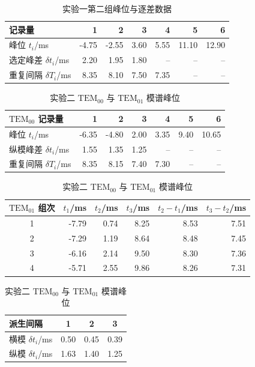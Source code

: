 \documentclass[UTF8,a4paper,10pt]{ctexart}
\begin{document}
\begin{table}[H]
  \centering
  \caption{实验一第二组峰位与逐差数据}
  \begin{tabular}{lrrrrrr}
    \toprule
    记录量 & 1 & 2 & 3 & 4 & 5 & 6 \\
    \midrule
    峰位 $t_i$/ms & -4.75 & -2.55 & 3.60 & 5.55 & 11.10 & 12.90 \\
    选定峰差 $\delta t_i$/ms & 2.20 & 1.95 & 1.80 & -- & -- & -- \\
    重复间隔 $\delta T_i$/ms & 8.35 & 8.10 & 7.50 & 7.35 & -- & -- \\
    \bottomrule
  \end{tabular}
\end{table}

\begin{table}[H]
  \centering
  \caption{实验二 $\mathrm{TEM}_{00}$ 与 $\mathrm{TEM}_{01}$ 模谱峰位}
  \begin{tabular}{lrrrrrr}
    \toprule
    $\mathrm{TEM}_{00}$ 记录量 & 1 & 2 & 3 & 4 & 5 & 6 \\
    \midrule
    峰位 $t_i$/ms & -6.35 & -4.80 & 2.00 & 3.35 & 9.40 & 10.65 \\
    纵模峰差 $\delta t_i$/ms & 1.55 & 1.35 & 1.25 & -- & -- & -- \\
    重复间隔 $\delta T_i$/ms & 8.35 & 8.15 & 7.40 & 7.30 & -- & -- \\
    \bottomrule
  \end{tabular}
  \par\medskip
  \setlength{\tabcolsep}{8pt}
  \begin{tabular}{crrrrr}
    \toprule
    $\mathrm{TEM}_{01}$ 组次 & $t_1$/ms & $t_2$/ms & $t_3$/ms & $t_2-t_1$/ms & $t_3-t_2$/ms \\
    \midrule
    1 & -7.79 & 0.74 & 8.25 & 8.53 & 7.51 \\
    2 & -7.29 & 1.19 & 8.64 & 8.48 & 7.45 \\
    3 & -6.16 & 2.14 & 9.50 & 8.30 & 7.36 \\
    4 & -5.71 & 2.55 & 9.86 & 8.26 & 7.31 \\
    \bottomrule
  \end{tabular}
  \par\medskip
  \begin{tabular}{lccc}
    \toprule
    派生间隔 & 1 & 2 & 3 \\
    \midrule
    横模 $\delta t_i$/ms & 0.50 & 0.45 & 0.39 \\
    纵模 $\delta t_i$/ms & 1.63 & 1.40 & 1.25 \\
    \bottomrule
  \end{tabular}
\end{table}
\end{document}
